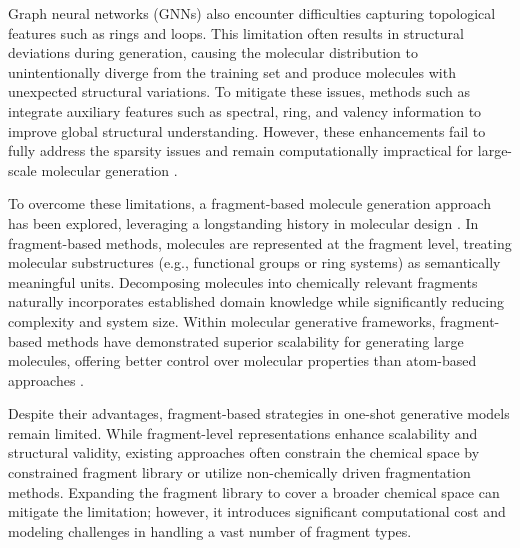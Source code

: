 Graph neural networks (GNNs) also encounter difficulties capturing topological features such as rings and loops. 
This limitation often results in structural deviations during generation, causing the molecular distribution to unintentionally diverge from the training set and produce molecules with unexpected structural variations.
To mitigate these issues, methods such as \citet{digress, defog} integrate auxiliary features such as spectral, ring, and valency information to improve global structural understanding.
However, these enhancements fail to fully address the sparsity issues and remain computationally impractical for large-scale molecular generation \citep{digress}. 

To overcome these limitations, a fragment-based molecule generation approach has been explored, leveraging a longstanding history in molecular design \citep{hajduk2007decade, joseph2014fragment, kirsch2019concepts}.
In fragment-based methods, molecules are represented at the fragment level, treating molecular substructures (e.g., functional groups or ring systems) as semantically meaningful units.
Decomposing molecules into chemically relevant fragments naturally incorporates established domain knowledge while significantly reducing complexity and system size.
Within molecular generative frameworks, fragment-based methods have demonstrated superior scalability for generating large molecules, offering better control over molecular properties than atom-based approaches \citep{jtvae, hierdiff, bbar, magnet}. 

Despite their advantages, fragment-based strategies in one-shot generative models remain limited. 
While fragment-level representations enhance scalability and structural validity, existing approaches \citep{fragment_based_diffusion, orgmol_design} often constrain the chemical space by constrained fragment library or utilize non-chemically driven fragmentation methods. 
Expanding the fragment library to cover a broader chemical space can mitigate the limitation; however, it introduces significant computational cost and modeling challenges in handling a vast number of fragment types. 

